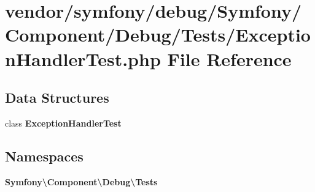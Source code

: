 \section{vendor/symfony/debug/\+Symfony/\+Component/\+Debug/\+Tests/\+Exception\+Handler\+Test.php File Reference}
\label{_exception_handler_test_8php}
\subsection*{Data Structures}
\begin{DoxyCompactItemize}
\item 
class {\bf Exception\+Handler\+Test}
\end{DoxyCompactItemize}
\subsection*{Namespaces}
\begin{DoxyCompactItemize}
\item 
 {\bf Symfony\textbackslash{}\+Component\textbackslash{}\+Debug\textbackslash{}\+Tests}
\end{DoxyCompactItemize}
